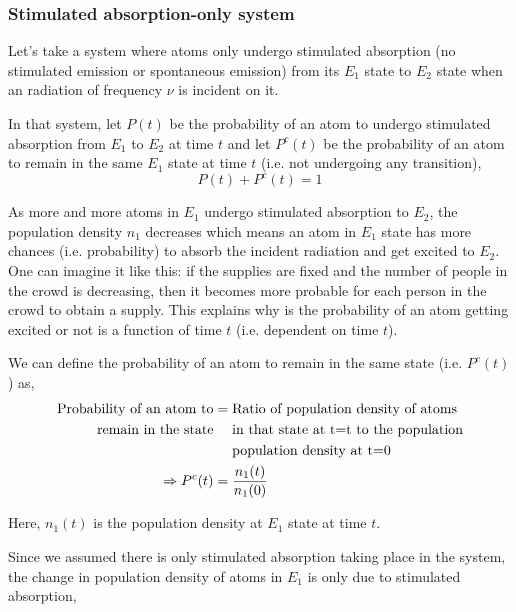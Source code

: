 \documentclass[12pt]{article}
\begin{document}
\subsubsection{Stimulated absorption-only system}

Let's take a system where atoms only undergo stimulated absorption (no stimulated emission or spontaneous emission) from its $E_{1}$ state to $E_{2}$ state when an radiation of frequency $\nu$ is incident on it. \vspace{.2cm}

In that system, let $P(t)$ be the probability of an atom to undergo stimulated absorption from $E_{1}$ to $E_{2}$ at time $t$ and let $P^c(t)$ be the probability of an atom to remain in the same $E_{1}$ state at time $t$ (i.e. not undergoing any transition), \vspace{.2cm}
\begin{equation}
    P(t) + P^c(t) = 1
\end{equation}

As more and more atoms in $E_{1}$ undergo stimulated absorption to $E_{2}$, the population density $n_{1}$ decreases which means an atom in $E_{1}$ state has more chances (i.e. probability) to absorb the incident radiation and get excited to $E_{2}$. One can imagine it like this: if the supplies are fixed and the number of people in the crowd is decreasing, then it becomes more probable for each person in the crowd to obtain a supply. This explains why is the probability of an atom getting excited or not is a function of time $t$ (i.e. dependent on time $t$). \vspace{.2cm}

We can define the probability of an atom to remain in the same state (i.e. $P^c(t)$) as,
\begin{align}
    \text{Probability of an atom to} & = \text{Ratio of population density of atoms} \notag \\
    \text{remain in the state} & \quad \text{  in that state at t=t to the population} \notag \\
    & \quad \text{  population density at t=0} \notag \\
    \Rightarrow P^c(t) & = \frac{n_{1}(t)}{n_{1}(0)} 
\end{align}

Here, $n_{1}(t)$ is the population density at $E_{1}$ state at time $t$. \vspace{.2cm}

Since we assumed there is only stimulated absorption taking place in the system, the change in population density of atoms in $E_{1}$ is only due to stimulated absorption,
\end{document}
